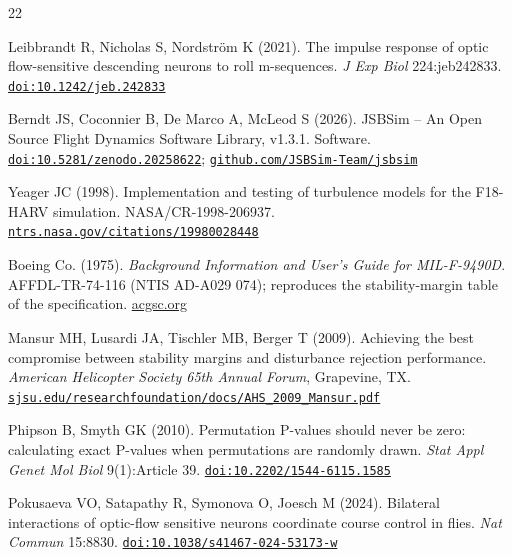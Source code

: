 \documentclass[11pt,letterpaper]{article}
\begin{document}
\begin{thebibliography}{22}

\protect{}\label{ref-16}{Leibbrandt R, Nicholas S,
Nordström K (2021). The impulse response of optic flow-sensitive
descending neurons to roll m-sequences. \emph{J Exp Biol} 224:jeb242833.
\href{https://doi.org/10.1242/jeb.242833}{\nolinkurl{doi:10.1242/jeb.242833}}}


\protect{}\label{ref-17}{Berndt JS, Coconnier B, De Marco
A, McLeod S (2026). JSBSim -- An Open Source Flight Dynamics Software
Library, v1.3.1. Software.
\href{https://doi.org/10.5281/zenodo.20258622}{\nolinkurl{doi:10.5281/zenodo.20258622}};
\href{https://github.com/JSBSim-Team/jsbsim}{\nolinkurl{github.com/JSBSim-Team/jsbsim}}}


\protect{}\label{ref-18}{Yeager JC (1998). Implementation
and testing of turbulence models for the F18-HARV simulation.
NASA/CR-1998-206937.
\href{https://ntrs.nasa.gov/citations/19980028448}{\nolinkurl{ntrs.nasa.gov/citations/19980028448}}}


\protect{}\label{ref-19}{Boeing Co. (1975).
\emph{Background Information and User's Guide for MIL-F-9490D}.
AFFDL-TR-74-116 (NTIS AD-A029 074); reproduces the stability-margin
table of the specification.
\href{https://www.acgsc.org/history/Early\%20Fly-By-Wire\%20Redundancy\%20Studies/User\%27s\%20Guide\%20to\%20MIL-F-9490D.pdf}{acgsc.org}}


\protect{}\label{ref-20}{Mansur MH, Lusardi JA, Tischler
MB, Berger T (2009). Achieving the best compromise between stability
margins and disturbance rejection performance. \emph{American Helicopter
Society 65th Annual Forum}, Grapevine, TX.
\href{https://www.sjsu.edu/researchfoundation/docs/AHS_2009_Mansur.pdf}{\nolinkurl{sjsu.edu/researchfoundation/docs/AHS_2009_Mansur.pdf}}}


\protect{}\label{ref-21}{Phipson B, Smyth GK (2010).
Permutation P-values should never be zero: calculating exact P-values
when permutations are randomly drawn. \emph{Stat Appl Genet Mol Biol}
9(1):Article 39.
\href{https://doi.org/10.2202/1544-6115.1585}{\nolinkurl{doi:10.2202/1544-6115.1585}}}


\protect{}\label{ref-22}{Pokusaeva VO, Satapathy R,
Symonova O, Joesch M (2024). Bilateral interactions of optic-flow
sensitive neurons coordinate course control in flies. \emph{Nat Commun}
15:8830.
\href{https://doi.org/10.1038/s41467-024-53173-w}{\nolinkurl{doi:10.1038/s41467-024-53173-w}}}

\end{thebibliography}
\end{document}

